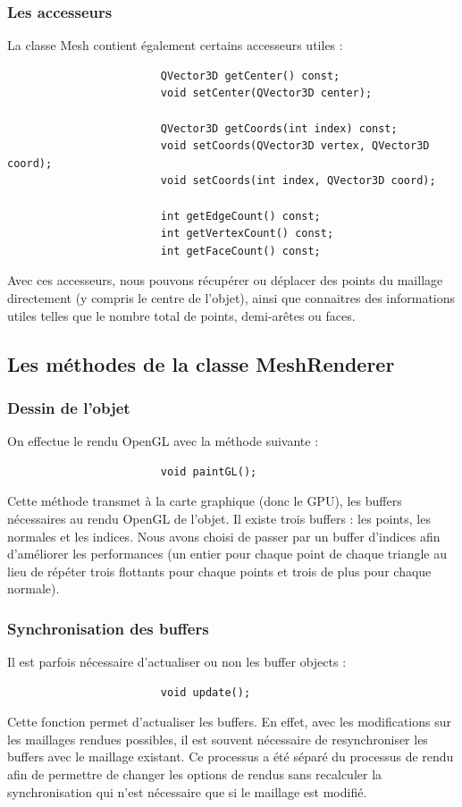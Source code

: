 \documentclass[a4paper]{memoir}
\begin{document}
				\subsubsection{Les accesseurs}
					La classe Mesh contient également certains accesseurs utiles :
					\begin{verbatim}
						QVector3D getCenter() const;
						void setCenter(QVector3D center);

						QVector3D getCoords(int index) const;
						void setCoords(QVector3D vertex, QVector3D coord);
						void setCoords(int index, QVector3D coord);

						int getEdgeCount() const;
						int getVertexCount() const;
						int getFaceCount() const;
					\end{verbatim}
					Avec ces accesseurs, nous pouvons récupérer ou déplacer des points du maillage directement (y compris le centre de l'objet), ainsi que 
					connaitres des informations utiles telles que le nombre total de points, demi-arêtes ou faces.
				
			\subsection{Les méthodes de la classe MeshRenderer}
				\label{renderer-dev}
				\subsubsection{Dessin de l'objet}
					On effectue le rendu OpenGL avec la méthode suivante :
					\begin{verbatim}
						void paintGL();
					\end{verbatim}
					Cette méthode transmet à la carte graphique (donc le GPU), les buffers nécessaires au rendu OpenGL de l'objet. Il existe trois buffers : 
					les points, les normales et les indices. Nous avons choisi de passer par un buffer d'indices afin d'améliorer les performances (un 
					entier pour chaque point de chaque triangle au lieu de répéter trois flottants pour chaque points et trois de plus pour chaque normale).
					
				\subsubsection{Synchronisation des buffers}
					Il est parfois nécessaire d'actualiser ou non les buffer objects :
					\begin{verbatim}
						void update();
					\end{verbatim}
					Cette fonction permet d'actualiser les buffers. En effet, avec les modifications sur les maillages rendues possibles, il est souvent 
					nécessaire de resynchroniser les buffers avec le maillage existant. Ce processus a été séparé du processus de rendu afin de permettre de 
					changer les options de rendus sans recalculer la synchronisation qui n'est nécessaire que si le maillage est modifié.
				
\end{document}
